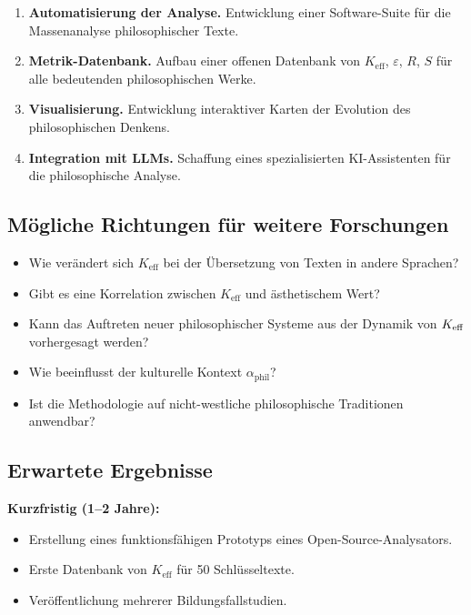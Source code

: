 \documentclass[12pt,a4paper]{article}
\newcommand{\eps}{\varepsilon}
\begin{document}
	\begin{enumerate}
		\item \textbf{Automatisierung der Analyse.} Entwicklung einer Software-Suite für die Massenanalyse philosophischer Texte.
		\item \textbf{Metrik-Datenbank.} Aufbau einer offenen Datenbank von \(K_{\mathrm{eff}}\), \(\eps\), \(R\), \(S\) für alle bedeutenden philosophischen Werke.
		\item \textbf{Visualisierung.} Entwicklung interaktiver Karten der Evolution des philosophischen Denkens.
		\item \textbf{Integration mit LLMs.} Schaffung eines spezialisierten KI-Assistenten für die philosophische Analyse.
	\end{enumerate}
	
	\subsection{Mögliche Richtungen für weitere Forschungen}
	
	\begin{itemize}
		\item Wie verändert sich \(K_{\mathrm{eff}}\) bei der Übersetzung von Texten in andere Sprachen?
		\item Gibt es eine Korrelation zwischen \(K_{\mathrm{eff}}\) und ästhetischem Wert?
		\item Kann das Auftreten neuer philosophischer Systeme aus der Dynamik von \(\Keff\) vorhergesagt werden?
		\item Wie beeinflusst der kulturelle Kontext \(\alpha_{\text{phil}}\)?
		\item Ist die Methodologie auf nicht-westliche philosophische Traditionen anwendbar?
	\end{itemize}
	
	\subsection{Erwartete Ergebnisse}
	
	\textbf{Kurzfristig (1–2 Jahre):}
	\begin{itemize}
		\item Erstellung eines funktionsfähigen Prototyps eines Open-Source-Analysators.
		\item Erste Datenbank von \(K_{\mathrm{eff}}\) für 50 Schlüsseltexte.
		\item Veröffentlichung mehrerer Bildungsfallstudien.
	\end{itemize}
	
\end{document}
